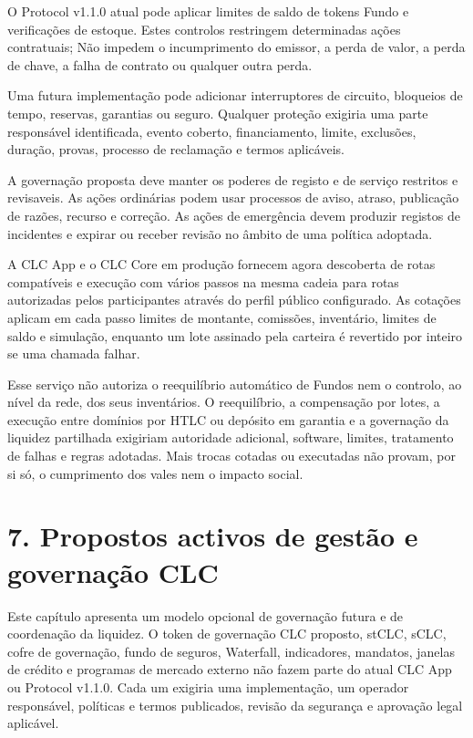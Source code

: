 \documentclass[11pt]{article}
\begin{document}
O Protocol v1.1.0 atual pode aplicar limites de saldo de tokens Fundo e verificações de estoque. Estes controlos restringem determinadas ações contratuais; Não impedem o incumprimento do emissor, a perda de valor, a perda de chave, a falha de contrato ou qualquer outra perda.

Uma futura implementação pode adicionar interruptores de circuito, bloqueios de tempo, reservas, garantias ou seguro. Qualquer proteção exigiria uma parte responsável identificada, evento coberto, financiamento, limite, exclusões, duração, provas, processo de reclamação e termos aplicáveis.

A governação proposta deve manter os poderes de registo e de serviço restritos e revisaveis. As ações ordinárias podem usar processos de aviso, atraso, publicação de razões, recurso e correção. As ações de emergência devem produzir registos de incidentes e expirar ou receber revisão no âmbito de uma política adoptada.

A CLC App e o CLC Core em produção fornecem agora descoberta de rotas compatíveis e execução com vários passos na mesma cadeia para rotas autorizadas pelos participantes através do perfil público configurado. As cotações aplicam em cada passo limites de montante, comissões, inventário, limites de saldo e simulação, enquanto um lote assinado pela carteira é revertido por inteiro se uma chamada falhar.

Esse serviço não autoriza o reequilíbrio automático de Fundos nem o controlo, ao nível da rede, dos seus inventários. O reequilíbrio, a compensação por lotes, a execução entre domínios por HTLC ou depósito em garantia e a governação da liquidez partilhada exigiriam autoridade adicional, software, limites, tratamento de falhas e regras adotadas. Mais trocas cotadas ou executadas não provam, por si só, o cumprimento dos vales nem o impacto social.


\section*{7. Propostos activos de gestão e governação CLC}

Este capítulo apresenta um modelo opcional de governação futura e de coordenação da liquidez. O token de governação CLC proposto, stCLC, sCLC, cofre de governação, fundo de seguros, Waterfall, indicadores, mandatos, janelas de crédito e programas de mercado externo não fazem parte do atual CLC App ou Protocol v1.1.0. Cada um exigiria uma implementação, um operador responsável, políticas e termos publicados, revisão da segurança e aprovação legal aplicável.
\end{document}
